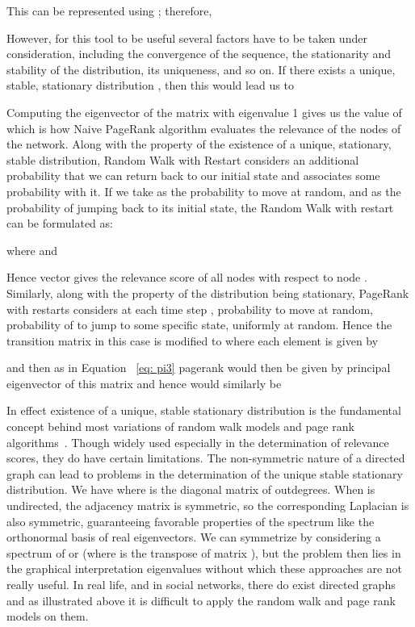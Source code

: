 \documentclass{sig-alternate}
\begin{document}
This can be represented using ;
therefore,


However, for this tool to be useful several factors have to be taken under consideration, including the convergence of the sequence, the stationarity and stability of the distribution, its uniqueness, and so on. If there exists a unique, stable, stationary distribution , then this would lead us to

Computing the eigenvector of the matrix  with eigenvalue 1 gives us the value of  which is how  Naive PageRank algorithm evaluates the relevance of the nodes of the network.
Along with the property of the existence of a unique,  stationary, stable distribution, Random Walk with Restart considers an additional probability  that we can return back to our initial state and associates some probability with it.
If we take  as the probability to move at random, and  as the probability of jumping back to its initial state, the Random Walk with restart can be formulated as:

where  and

Hence vector  gives the relevance score of all nodes  with respect to node .
Similarly, along with the property of the distribution being stationary, PageRank with restarts considers at each time step , probability   to move at random, probability of  to jump to some specific state, uniformly at random. Hence the transition matrix in this case is modified to  where each element  is given by

and then as in Equation ~\ref{eq: pi3}  pagerank  would then be given by principal eigenvector of this matrix and hence  would similarly be


In effect  existence of a unique, stable stationary distribution is the fundamental concept behind most variations of  random walk models and page rank algorithms~\cite{tong,PageRank}. Though widely used especially in the determination of relevance scores, they do have certain limitations.
The non-symmetric nature of a directed graph can lead to problems in the determination of  the unique stable stationary distribution. We have  where  is the diagonal matrix of outdegrees. When  is undirected, the adjacency matrix  is symmetric, so the corresponding Laplacian is also symmetric, guaranteeing  favorable properties of the spectrum like the orthonormal basis of real eigenvectors. We can symmetrize  by considering a spectrum of  or  (where  is the transpose of matrix ), but the problem then lies in the graphical interpretation eigenvalues without which these approaches are not really useful. In real life, and in social networks, there do exist directed graphs and as illustrated above it is difficult to apply  the random walk and page rank models on them.
\end{document}
